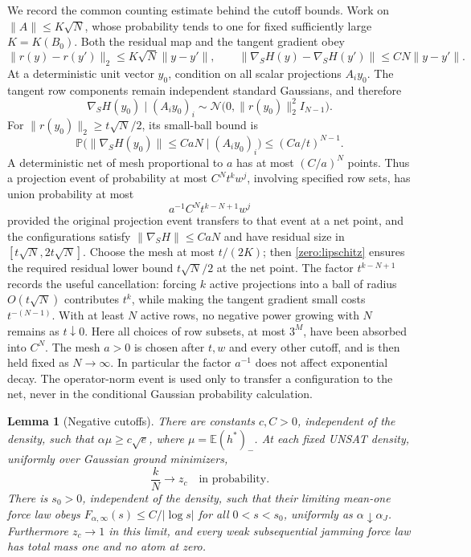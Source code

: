 \documentclass[11pt,a4paper]{article}
\numberwithin{equation}{section}
\newtheorem{lemma}[theorem]{Lemma}
\theoremstyle{definition}
\theoremstyle{remark}
\newcommand{\E}{\mathbb E}
\newcommand{\Prob}{\mathbb P}
\newcommand{\cN}{\mathcal N}
\begin{document}
We record the common counting estimate behind the cutoff bounds.
Work on \(\|A\|\le K\sqrt N\), whose probability tends to one for
fixed sufficiently large \(K=K(B_0)\).  Both the residual map and the
tangent gradient obey
\begin{equation}\label{zero:lipschitz}
 \|r(y)-r(y')\|_2\le K\sqrt N\|y-y'\|,
 \qquad
 \|\nabla_S H(y)-\nabla_S H(y')\|\le C N\|y-y'\|.
\end{equation}
At a deterministic unit vector \(y_0\), condition on all scalar
projections \(A_i y_0\).  The tangent row components remain independent
standard Gaussians, and therefore
\[
 \nabla_S H(y_0)\mid(A_i y_0)_i
 \sim\cN\bigl(0,\|r(y_0)\|_2^2 I_{N-1}\bigr).
\]
For \(\|r(y_0)\|_2\ge t\sqrt N/2\), its small-ball bound is
\begin{equation}\label{zero:gradient-small-ball}
 \Prob\bigl(\|\nabla_S H(y_0)\|\le CaN\mid(A_i y_0)_i\bigr)
 \le(Ca/t)^{N-1}.
\end{equation}
A deterministic net of mesh proportional to \(a\) has at most
\((C/a)^N\) points.  Thus a projection event of probability at most
\(C^N t^k w^j\), involving specified row sets, has union probability
at most
\begin{equation}\label{zero:net-master}
 a^{-1}C^N t^{k-N+1}w^j
\end{equation}
provided the original projection event transfers to that event
at a net point, and the configurations satisfy
\(\|\nabla_S H\|\le CaN\) and have residual size in
\([t\sqrt N,2t\sqrt N]\).  Choose the mesh at most $t/(2K)$;
then \eqref{zero:lipschitz} ensures the required residual lower
bound $t\sqrt N/2$ at the net point.  The factor $t^{k-N+1}$ records the useful cancellation: forcing $k$
active projections into a ball of radius $O(t\sqrt N)$ contributes
$t^k$, while making the tangent gradient small costs $t^{-(N-1)}$.
With at least $N$ active rows, no negative power growing with $N$
remains as $t\downarrow0$.
Here all choices of row subsets, at most
\(3^M\), have been absorbed into \(C^N\).  The mesh \(a>0\) is
chosen after \(t,w\) and every other cutoff, and is then held fixed
as \(N\to\infty\).  In particular the factor \(a^{-1}\) does not
affect exponential decay.  The operator-norm event is used only to
transfer a configuration to the net, never in the conditional
Gaussian probability calculation.

\begin{lemma}[Negative cutoffs]\label{zero:negative-cutoffs}
There are constants $c,C>0$, independent of the density, such that
$\alpha\mu\ge c\sqrt e$, where $\mu=\E(h^*)_-$.  At each fixed
UNSAT density, uniformly over Gaussian ground minimizers,
\[
 \frac{k}{N}\longrightarrow z_c\quad\text{in probability}.
\]
There is \(s_0>0\), independent of the density, such that their
limiting mean-one force law obeys
\(F_{\alpha,\infty}(s)\le C/|\log s|\) for all \(0<s<s_0\),
uniformly as \(\alpha\downarrow\alpha_J\).
Furthermore \(z_c\to1\) in this limit, and every weak subsequential
jamming force law has total mass one and no atom at zero.
\end{lemma}
\end{document}
